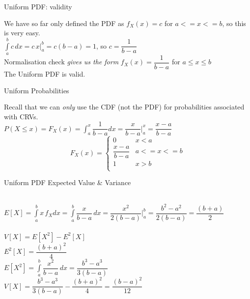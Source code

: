\documentclass[10pt,sans,english,compress,xcolor=dvipsnames]{beamer}
\begin{document}
\begin{frame}{Uniform PDF: validity}

We have so far only defined the PDF as $f_X(x) =c$ for $a<= x<=b$, so this is very easy.\\[1ex]

$\int\limits_a^b c\, dx = c\,x \bigg|_a^b = c(b-a) =1$, so $c = \dfrac{1}{ b-a}$\\[1ex]

Normalisation check \textit{gives us the form} $f_X(x) =\dfrac{1}{ b-a}$  for $ a\leq x\leq b$\\[1ex]

The Uniform PDF is valid.

\end{frame}  

\begin{frame}{Uniform Probabilities}

Recall that we can \textit{only} use the CDF (not the PDF) for probabilities associated with CRVs.\\[1ex]

$P(X\leq x) = F_X(x) = \displaystyle \int_a^x \dfrac{1}{ b-a} dx = \dfrac{x}{ b-a} \bigg|_a^x =  \dfrac{x-a}{ b-a} $\\[1ex]

\small
\begin{equation}\nonumber
F_X(x) = 
\begin{cases}
     0\; & x<a\\[1ex] 
     \dfrac{x-a}{ b-a} & a<= x<=b\\[1ex] 
      1 & x>b \\[2ex]
\end{cases}
\end{equation}

\end{frame}  

\begin{frame}{Uniform PDF Expected Value \& Variance}
\small

\\[1ex]

$E[X]  = \int\limits_{a}^{b} x\, f_X dx = \int\limits_{a}^{b}  \dfrac{x}{b-a}\, dx = \dfrac{x^2}{2(b-a)}\bigg|_a^b = \dfrac{b^2-a^2}{2(b-a)} = \dfrac{ (b+a)}{2}$\\[1ex]

\\[1ex]

$V[X]  =E[X^2] - E^2[X]$\\[1ex]
$E^2[X]  = \dfrac{ (b+a)^2}{4}$\\[1ex]
$E[X^2]  = \int\limits_{a}^{b} \dfrac{x^2}{b-a}\, dx =  \dfrac{b^3-a^3 }{3(b-a)}$\\[1ex]
$V[X]   = \dfrac{b^3-a^3 }{ 3(b-a)} - \dfrac{ (b+a)^2}{4} = \dfrac{ (b-a)^2}{12}$ \\[1ex]

\end{frame}  
\end{document}
